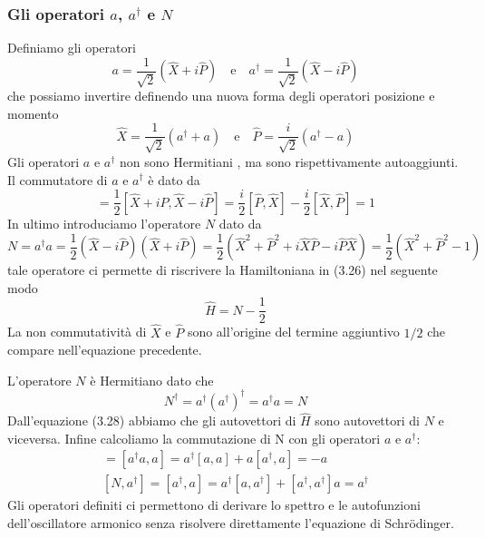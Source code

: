 \subsubsection{Gli operatori $a$, $a^\dag$ e $N$}

Definiamo gli operatori 
\begin{equation}
	a = \frac{1}{\sqrt{2}}(\hat{X} + i \hat{P}) \quad \text{e} \quad a^{\dag} = \frac{1}{\sqrt{2}}(\hat{X} - i \hat{P})
\end{equation}
che possiamo invertire definendo una nuova forma degli operatori posizione e momento 
\begin{equation*}
	\hat{X} = \frac{1}{\sqrt{2}}(a^\dag + a) \quad \text{e} \quad \hat{P} = \frac{i}{\sqrt{2}}(a^\dag-a) 
\end{equation*}
Gli operatori $a$ e $a^\dag$ non sono Hermitiani , ma sono rispettivamente autoaggiunti. Il commutatore di $a$ e $a^\dag$ \`e dato da
\begin{equation*}
	[a,a^\dag] = \frac{1}{2}\left [\hat{X}+i\hat{P},\hat{X}-i\hat{P}\right ] = \frac{i}{2}\left [ \hat{P},\hat{X}\right]-\frac{i}{2} \left[\hat{X},\hat{P} \right] = 1
\end{equation*}
In ultimo introduciamo l'operatore $N$ dato da
\begin{equation*}
	N = a^\dag a = \frac{1}{2}(\hat{X} - i \hat{P})(\hat{X}+i\hat{P}) = \frac{1}{2}(\hat{X}^2+\hat{P}^2 + i\hat{X}\hat{P} - i \hat{P}\hat{X}) = \frac{1}{2}(\hat{X}^2 + \hat{P}^2-1)
\end{equation*}
tale operatore ci permette di riscrivere la Hamiltoniana in (3.26) nel seguente modo
\begin{equation}
	\hat{H} = N - \frac{1}{2}
\end{equation}
La non commutativit\`a di $\hat{X}$ e $\hat{P}$ sono all'origine del termine aggiuntivo $1/2$ che compare nell'equazione precedente.

L'operatore $N$ \`e Hermitiano dato che 
\begin{equation*}
	N^\dag = a^\dag(a^\dag)^{\dag} = a^\dag a = N 
\end{equation*}
Dall'equazione (3.28) abbiamo che gli autovettori di $\hat{H}$ sono autovettori di $N$ e viceversa. Infine calcoliamo la commutazione di N con gli operatori $a$ e $a^\dag$:
\begin{align*}
	[N,a] = [a^\dag a, a] = a^{\dag}[a,a]+a[a^\dag,a] = - a \\[0.4cm] 
	[N,a^\dag] = [a^\dag,a] = a^\dag[a,a^\dag]+ [a^\dag,a^\dag]a = a^\dag
\end{align*}
Gli operatori definiti ci permettono di derivare lo spettro e le autofunzioni dell'oscillatore armonico senza risolvere direttamente l'equazione di Schr\"odinger. 



